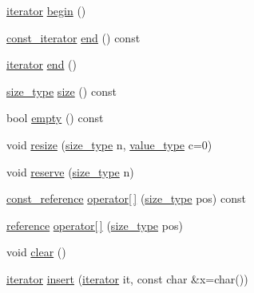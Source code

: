 \begin{DoxyCompactItemize}
\item 
\mbox{\hyperlink{class_c_base_data_stream_a23e0e0af1c68dd36c27162036b6d048d}{iterator}} \mbox{\hyperlink{class_c_base_data_stream_a6b26f6547fc8d86bee0d9158805bb1ac}{begin}} ()
\item 
\mbox{\hyperlink{class_c_base_data_stream_a9cf3080c5a75c94568980a59d3aab3ad}{const\+\_\+iterator}} \mbox{\hyperlink{class_c_base_data_stream_a7d083ceebeb6f4ea63d2434f8b11a292}{end}} () const
\item 
\mbox{\hyperlink{class_c_base_data_stream_a23e0e0af1c68dd36c27162036b6d048d}{iterator}} \mbox{\hyperlink{class_c_base_data_stream_ac511b088f239c8e086322d50bcc762fe}{end}} ()
\item 
\mbox{\hyperlink{class_c_base_data_stream_ad042ddea628c43357b9b13be89c71964}{size\+\_\+type}} \mbox{\hyperlink{class_c_base_data_stream_aea822d9dff7d0f3e4adb96dba79126a5}{size}} () const
\item 
bool \mbox{\hyperlink{class_c_base_data_stream_ac2a82d5383c034f844b70a67ed580806}{empty}} () const
\item 
void \mbox{\hyperlink{class_c_base_data_stream_a620febffdbbcabbd4a21fcd67e6d1154}{resize}} (\mbox{\hyperlink{class_c_base_data_stream_ad042ddea628c43357b9b13be89c71964}{size\+\_\+type}} n, \mbox{\hyperlink{class_c_base_data_stream_a92957c776eb4c9a7668dd9cd82f7dbdd}{value\+\_\+type}} c=0)
\item 
void \mbox{\hyperlink{class_c_base_data_stream_aeff66bbf5f2494240e3f8106540ff676}{reserve}} (\mbox{\hyperlink{class_c_base_data_stream_ad042ddea628c43357b9b13be89c71964}{size\+\_\+type}} n)
\item 
\mbox{\hyperlink{class_c_base_data_stream_aabfd39998036383d2ee384029f221aab}{const\+\_\+reference}} \mbox{\hyperlink{class_c_base_data_stream_a0cfc7c327973830d505a6ca59beddae6}{operator\mbox{[}$\,$\mbox{]}}} (\mbox{\hyperlink{class_c_base_data_stream_ad042ddea628c43357b9b13be89c71964}{size\+\_\+type}} pos) const
\item 
\mbox{\hyperlink{class_c_base_data_stream_a74ec577e6f675c786880b39700b8f317}{reference}} \mbox{\hyperlink{class_c_base_data_stream_aa56015ceb6b79db5cfc08695d68310bf}{operator\mbox{[}$\,$\mbox{]}}} (\mbox{\hyperlink{class_c_base_data_stream_ad042ddea628c43357b9b13be89c71964}{size\+\_\+type}} pos)
\item 
void \mbox{\hyperlink{class_c_base_data_stream_af453f4e42cd6ba6b76d925c4c137786e}{clear}} ()
\item 
\mbox{\hyperlink{class_c_base_data_stream_a23e0e0af1c68dd36c27162036b6d048d}{iterator}} \mbox{\hyperlink{class_c_base_data_stream_aab96f99c03e7cb36e8345701e49707c9}{insert}} (\mbox{\hyperlink{class_c_base_data_stream_a23e0e0af1c68dd36c27162036b6d048d}{iterator}} it, const char \&x=char())

\end{DoxyCompactItemize}
